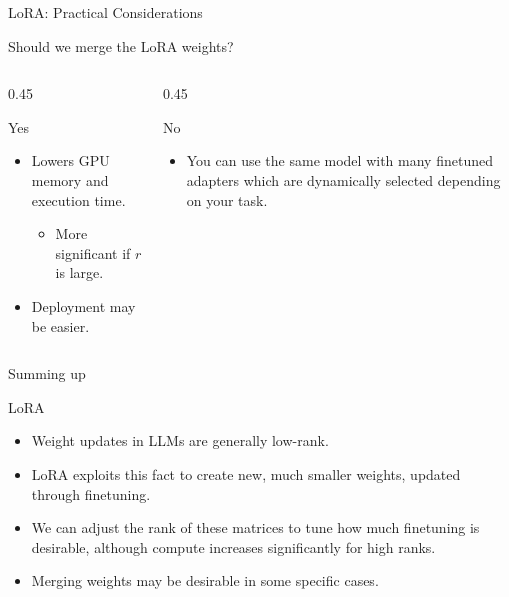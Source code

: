 \documentclass[24pt]{beamer}
\begin{document}
\begin{frame}{LoRA: Practical Considerations}
{\begin{block}{Should we merge the LoRA weights?}
			\begin{columns}
				\begin{column}{0.45\columnwidth}
					\begin{exampleblock}{Yes}
						\begin{itemize}
							\item Lowers \alert{GPU memory} and execution
							\alert{time}.
							\begin{itemize}
								\item More significant if $r$ is large.
							\end{itemize}
							\item Deployment may be easier.
						\end{itemize}
					\end{exampleblock}
				\end{column}
				
				\begin{column}{0.45\columnwidth}
					\begin{alertblock}{No}
						\begin{itemize}
							\item You can use the same model with \alert{many}
							finetuned adapters which are
							\alert{dynamically selected} depending on your
							task.
						\end{itemize}
					\end{alertblock}
				\end{column}
			\end{columns}
		\end{block}
	}
\end{frame}

\begin{frame}{Summing up}
	\begin{block}{LoRA}
		\begin{itemize}
			\item Weight updates in LLMs are generally low-rank.
			\item LoRA exploits this fact to create new, much smaller weights, updated through finetuning.
			\item We can adjust the rank of these matrices to tune how much finetuning is desirable, although compute increases significantly for high ranks.
			\item Merging weights may be desirable in some specific cases.
		\end{itemize}
	\end{block}
\end{frame}
\end{document}
